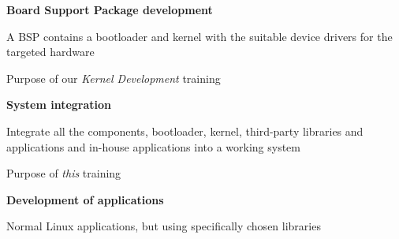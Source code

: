   \startitemize
  \item {\bf Board Support Package development}
    \startitemize
    \item A BSP contains a bootloader and kernel with the suitable
      device drivers for the targeted hardware
    \item Purpose of our {\em Kernel Development} training
    \stopitemize
  \item {\bf System integration}
    \startitemize
    \item Integrate all the components, bootloader, kernel,
      third-party libraries and applications and in-house applications
      into a working system
    \item Purpose of {\em this} training
    \stopitemize
  \item {\bf Development of applications}
    \startitemize
    \item Normal Linux applications, but using specifically chosen
      libraries
    \stopitemize
  \stopitemize

